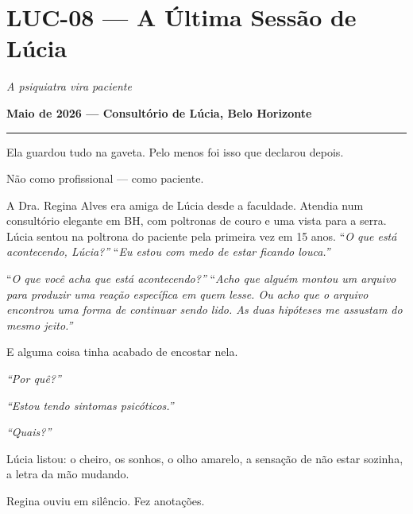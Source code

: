 \section*{\textbf{LUC-08} --- A Última Sessão de Lúcia}

\noindent \textit{A psiquiatra vira paciente}

\noindent \textbf{Maio de 2026 --- Consultório de Lúcia, Belo Horizonte}

\vspace{0.5em}\noindent\rule{\textwidth}{0.5pt}\vspace{0.5em}

\noindent Ela guardou tudo na gaveta.
\noindent Pelo menos foi isso que declarou depois.

\noindent Não como profissional --- como paciente.

\noindent A Dra. Regina Alves era amiga de Lúcia desde a faculdade. Atendia num consultório elegante em BH, com poltronas de couro e uma vista para a serra. Lúcia sentou na poltrona do paciente pela primeira vez em 15 anos.
\noindent \textquotedblleft{\textit{O que está acontecendo, Lúcia?\textquotedblright{}}}
\noindent \textquotedblleft{\textit{Eu estou com medo de estar ficando louca.\textquotedblright{}}}

\noindent \textquotedblleft{\textit{O que você acha que está acontecendo?\textquotedblright{}}}
\noindent \textquotedblleft{\textit{Acho que alguém montou um arquivo para produzir uma reação específica em quem lesse. Ou acho que o arquivo encontrou uma forma de continuar sendo lido. As duas hipóteses me assustam do mesmo jeito.\textquotedblright{}}}

\noindent E alguma coisa tinha acabado de encostar nela.

\noindent \textit{\textquotedblleft{}Por quê?\textquotedblright{}}

\noindent \textit{\textquotedblleft{}Estou tendo sintomas psicóticos.\textquotedblright{}}

\noindent \textit{\textquotedblleft{}Quais?\textquotedblright{}}

\noindent Lúcia listou: o cheiro, os sonhos, o olho amarelo, a sensação de não estar sozinha, a letra da mão mudando.

\noindent Regina ouviu em silêncio. Fez anotações.


